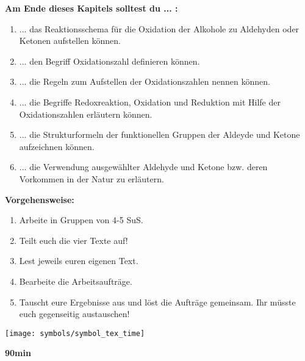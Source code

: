 \documentclass{scrartcl}  %
\begin{document}
			\begin{minipage}{0.7\textwidth}
				\noindent \textbf{Am Ende dieses Kapitels solltest du ... :}
				\begin{enumerate}
					\item ... das Reaktionsschema für die Oxidation der Alkohole zu Aldehyden oder Ketonen aufstellen können.
					\item ... den Begriff Oxidationszahl definieren können.
					\item ... die Regeln zum Aufstellen der Oxidationszahlen nennen können.
					\item ... die Begriffe Redoxreaktion, Oxidation und Reduktion mit Hilfe der Oxidationszahlen erläutern können. 
					\item ... die Strukturformeln der funktionellen Gruppen der Aldeyde und Ketone aufzeichnen können.
					\item ... die Verwendung ausgewählter Aldehyde und Ketone bzw. deren Vorkommen in der Natur zu erläutern.  
				\end{enumerate}	
				
				\noindent \textbf{Vorgehensweise:}
				\begin{enumerate}
					\item Arbeite in Gruppen von 4-5 SuS.
					\item Teilt euch die vier Texte auf!
					\item Lest jeweils euren eigenen Text. 
					\item Bearbeite die Arbeitsaufträge. 
					\item Tauscht eure Ergebnisse aus und löst die Aufträge gemeinsam. Ihr müsste euch gegenseitig austauschen!
				\end{enumerate}	
			\end{minipage}
			\hspace{0.1\textwidth}
			\begin{minipage}{0.2\textwidth}
				\begin{tcolorbox}
					[enhanced,
					width=0.9\textwidth,
					colback=white,
					colframe=black,
					fonttitle=\sffamily\bfseries\large, 
					title=Zeit,  %
					attach boxed title to top center={xshift=-0.0mm,yshift=-0.50mm},
					boxed title style={skin=enhancedfirst jigsaw,size=small,arc=1mm,bottom=-1mm,colframe=black,height=0.75cm},
					colbacktitle=black,
					drop lifted shadow]
					\centering
					\texttt{[image: symbols/symbol\_tex\_time]}
					
					\begin{center}
						\textbf{90min}
					\end{center}
				\end{tcolorbox}
			\end{minipage}
			
\end{document}
